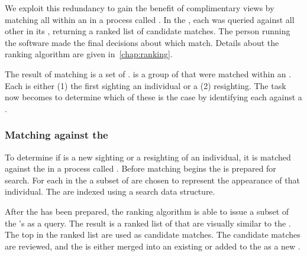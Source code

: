             We exploit this redundancy to gain the benefit of complimentary views by matching all \annots{} within an
            \occurrence{} in a process called . In the \GZC{}, each \annot{} was
            queried against all other \annots{} in its \occurrence{}, returning a ranked list of candidate matches. The
            person running the software made the final decisions about which \annots{} match. Details about the ranking
            algorithm are given in~\cref{chap:ranking}.

            The result of \intraoccurrence{} matching is a set of \glossterm{\encounters{}}. \Aan{\encounter{}} is a
            group of \annots{} that were matched within an \occurrence{}. Each \encounter{} is either (1) the first
            sighting an individual or a (2) resighting. The task now becomes to determine which of these is the case by
            identifying each \encounter{} against a \masterdatabase{}.

            \OccurrenceComplementFigure{}
 
        \subsubsection{Matching against the \masterdatabase{}} %
            To determine if \aan{\encounter{}} is a new sighting or a resighting of an individual, it is matched against
            the \masterdatabase{} in a process called . Before matching begins the
            \masterdatabase{} is prepared for search. For each \name{} in the \masterdatabase{} a subset of
            \glossterm{\exemplar{}} \annots{} are chosen to represent the appearance of that individual. The
            \exemplars{} are indexed using a search data structure.

            After the \masterdatabase{} has been prepared, the ranking algorithm is able to issue a subset of the
            \encounter{}'s \annots{} as a query. The result is a ranked list of \exemplars{} that are visually similar
            to the \encounter{}. The top \exemplars{} in the ranked list are used as candidate matches. The candidate
            matches are reviewed, and the \encounter{} is either merged into an existing \mastername{} or added to the
            \masterdatabase{} as a new \mastername{}.

